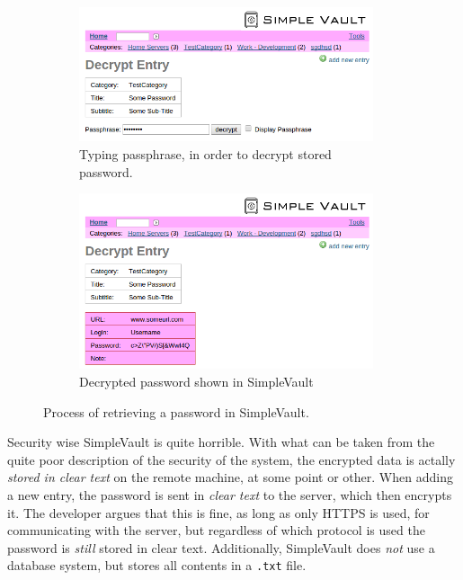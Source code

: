 			\begin{figure}[htbp]
				\centering
				\begin{subfigure}{\textwidth}
					\centering
					\includegraphics[width=0.95\textwidth]{figures/analysis/simplevault_getpassword.png}
					\caption{Typing passphrase, in order to decrypt stored password.}
					\label{fig:simplevault_getpassword_type}
				\end{subfigure}%
				
				\begin{subfigure}{\textwidth}
					\centering
					\includegraphics[width=0.95\textwidth]{figures/analysis/simplevault_getpassword_decrypted.png}
					\caption{Decrypted password shown in SimpleVault}
					\label{fig:simplevault_getpassword_decrypted}
				\end{subfigure}
				
				\caption{Process of retrieving a password in SimpleVault.}
				\label{fig:simplevault_getpassword}
			\end{figure}


			Security wise SimpleVault is quite horrible. With what can be taken from the quite poor description of the security of the system, the encrypted data is actally \emph{stored in clear text} on the remote machine, at some point or other. When adding a new entry, the password is sent in \emph{clear text} to the server, which then encrypts it. The developer argues that this is fine, as long as only HTTPS is used, for communicating with the server, but regardless of which protocol is used the password is \emph{still} stored in clear text. Additionally, SimpleVault does \emph{not} use a database system, but stores all contents in a \verb=.txt= file. 


